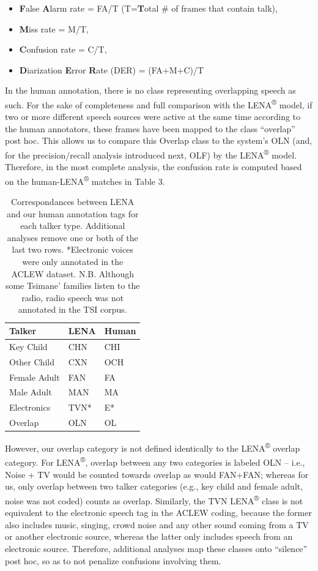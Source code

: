 \documentclass[english,floatsintext,man]{apa6}
\providecommand{\tightlist}{%
  \setlength{\itemsep}{0pt}\setlength{\parskip}{0pt}}
\begin{document}
\begin{itemize}
\tightlist
\item
  \textbf{F}alse \textbf{A}larm rate = FA/T (T=\textbf{T}otal \# of
  frames that contain talk),
\item
  \textbf{M}iss rate = M/T,
\item
  \textbf{C}onfusion rate = C/T,
\item
  \textbf{D}iarization \textbf{E}rror \textbf{R}ate (DER) = (FA+M+C)/T
\end{itemize}

In the human annotation, there is no class representing overlapping
speech as such. For the sake of completeness and full comparison with
the LENA\textsuperscript{®} model, if two or more different speech
sources were active at the same time according to the human annotators,
these frames have been mapped to the class \enquote{overlap} post hoc.
This allows us to compare this Overlap class to the system's OLN (and,
for the precision/recall analysis introduced next, OLF) by the
LENA\textsuperscript{®} model. Therefore, in the most complete analysis,
the confusion rate is computed based on the
human-LENA\textsuperscript{®} matches in Table 3.

\begin{table}[t]

\caption{\label{tab:tab-tsicor}Correspondances between LENA and our human annotation tags for each talker type. Additional analyses remove one or both of the last two rows. *Electronic voices were only annotated in the ACLEW dataset. N.B. Although some Tsimane' families listen to the radio, radio speech was not annotated in the TSI corpus.}
\centering
\begin{tabular}{>{\raggedright\arraybackslash}p{4cm}>{\raggedright\arraybackslash}p{2cm}>{\raggedright\arraybackslash}p{2cm}}
\toprule
Talker & LENA & Human\\
\midrule
Key Child & CHN & CHI\\
Other Child & CXN & OCH\\
Female Adult & FAN & FA\\
Male Adult & MAN & MA\\
Electronics & TVN* & E*\\
\addlinespace
Overlap & OLN & OL\\
\bottomrule
\end{tabular}
\end{table}

However, our overlap category is not defined identically to the
LENA\textsuperscript{®} overlap category. For LENA\textsuperscript{®},
overlap between any two categories is labeled OLN -- i.e., Noise + TV
would be counted towards overlap as would FAN+FAN; whereas for us, only
overlap between two talker categories (e.g., key child and female adult,
noise was not coded) counts as overlap. Similarly, the TVN
LENA\textsuperscript{®} class is not equivalent to the electronic speech
tag in the ACLEW coding, because the former also includes music,
singing, crowd noise and any other sound coming from a TV or another
electronic source, whereas the latter only includes speech from an
electronic source. Therefore, additional analyses map these classes onto
\enquote{silence} post hoc, so as to not penalize confusions involving
them.
\end{document}
